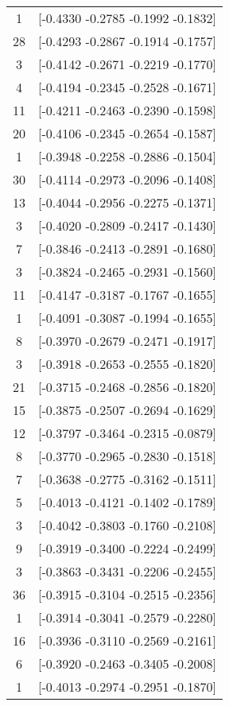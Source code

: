 \documentclass[12pt, fullpage,letterpaper]{article}
\begin{document}
\begin{enumerate}
\begin{enumerate}
{\begin{longtable}{|c|c|}
			  1 &  [-0.4330 -0.2785 -0.1992 -0.1832] \\
			 28 &  [-0.4293 -0.2867 -0.1914 -0.1757] \\
			  3 &  [-0.4142 -0.2671 -0.2219 -0.1770] \\
			  4 &  [-0.4194 -0.2345 -0.2528 -0.1671] \\
			 11 &  [-0.4211 -0.2463 -0.2390 -0.1598] \\
			 20 &  [-0.4106 -0.2345 -0.2654 -0.1587] \\
			  1 &  [-0.3948 -0.2258 -0.2886 -0.1504] \\
			 30 &  [-0.4114 -0.2973 -0.2096 -0.1408] \\
			 13 &  [-0.4044 -0.2956 -0.2275 -0.1371] \\
			  3 &  [-0.4020 -0.2809 -0.2417 -0.1430] \\
			  7 &  [-0.3846 -0.2413 -0.2891 -0.1680] \\
			  3 &  [-0.3824 -0.2465 -0.2931 -0.1560] \\
			 11 &  [-0.4147 -0.3187 -0.1767 -0.1655] \\
			  1 &  [-0.4091 -0.3087 -0.1994 -0.1655] \\
			  8 &  [-0.3970 -0.2679 -0.2471 -0.1917] \\
			  3 &  [-0.3918 -0.2653 -0.2555 -0.1820] \\
			 21 &  [-0.3715 -0.2468 -0.2856 -0.1820] \\
			 15 &  [-0.3875 -0.2507 -0.2694 -0.1629] \\
			 12 &  [-0.3797 -0.3464 -0.2315 -0.0879] \\
			  8 &  [-0.3770 -0.2965 -0.2830 -0.1518] \\
			  7 &  [-0.3638 -0.2775 -0.3162 -0.1511] \\
			  5 &  [-0.4013 -0.4121 -0.1402 -0.1789] \\
			  3 &  [-0.4042 -0.3803 -0.1760 -0.2108] \\
			  9 &  [-0.3919 -0.3400 -0.2224 -0.2499] \\
			  3 &  [-0.3863 -0.3431 -0.2206 -0.2455] \\
			 36 &  [-0.3915 -0.3104 -0.2515 -0.2356] \\
			  1 &  [-0.3914 -0.3041 -0.2579 -0.2280] \\
			 16 &  [-0.3936 -0.3110 -0.2569 -0.2161] \\
			  6 &  [-0.3920 -0.2463 -0.3405 -0.2008] \\
			  1 &  [-0.4013 -0.2974 -0.2951 -0.1870] \\

\end{longtable}}
\end{enumerate}
\end{enumerate}
\end{document}
